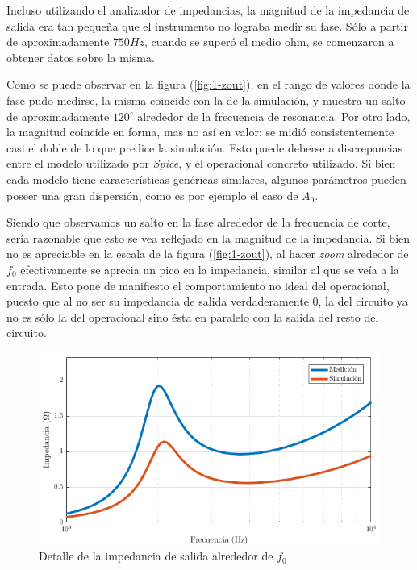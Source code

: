 \documentclass[../../tc_tp3_main.tex]{subfiles}
\begin{document}
Incluso utilizando el analizador de impedancias, la magnitud de la impedancia de salida era tan peque\~na que el instrumento no lograba medir su fase. S\'olo a partir de aproximadamente $750Hz$, cuando se super\'o el medio ohm, se comenzaron a obtener datos sobre la misma. \par

Como se puede observar en la figura (\ref{fig:1-zout}), en el rango de valores donde la fase pudo medirse, la misma coincide con la de la simulaci\'on, y muestra un salto de aproximadamente $120^\circ$ alrededor de la frecuencia de resonancia. Por otro lado, la magnitud coincide en forma, mas no as\'i en valor: se midi\'o consistentemente casi el doble de lo que predice la simulaci\'on. Esto puede deberse a discrepancias entre el modelo utilizado por \textit{Spice}, y el operacional concreto utilizado. Si bien cada modelo tiene caracter\'isticas gen\'ericas similares, algunos par\'ametros pueden poseer una gran dispersi\'on, como es por ejemplo el caso de $A_0$. \par 

Siendo que observamos un salto en la fase alrededor de la frecuencia de corte, ser\'ia razonable que esto se vea reflejado en la magnitud de la impedancia. Si bien no es apreciable en la escala de la figura (\ref{fig:1-zout}), al hacer \textit{zoom} alrededor de $f_0$ efectivamente se aprecia un pico en la impedancia, similar al que se ve\'ia a la entrada. Esto pone de manifiesto el comportamiento no ideal del operacional, puesto que al no ser su impedancia de salida verdaderamente 0, la del circuito ya no es s\'olo la del operacional sino \'esta en paralelo con la salida del resto del circuito. 

\begin{figure}[H]
	\centering
  	\includegraphics[scale = 0.5]{imagenes/tc_tp3_ej1_zout_zoom.png}
  	\caption{Detalle de la impedancia de salida alrededor de $f_0$}
  	\label{fig:1-zout-zoom1}
\end{figure}
\end{document}
